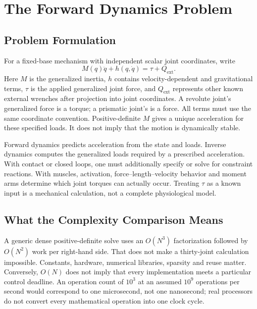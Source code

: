 \section{The Forward Dynamics Problem}
\label{sec:forward_dynamics_problem}

\subsection{Problem Formulation}
\label{subsec:fd_formulation}

For a fixed-base mechanism with independent scalar joint coordinates, write
\begin{equation}
 M(q)\ddot q+h(q,\dot q)=\tau+Q_{\mathrm{ext}}.
\end{equation}
Here $M$ is the generalized inertia, $h$ contains velocity-dependent and gravitational terms, $\tau$ is the applied generalized joint force, and $Q_{\mathrm{ext}}$ represents other known external wrenches after projection into joint coordinates. A revolute joint's generalized force is a torque; a prismatic joint's is a force. All terms must use the same coordinate convention. Positive-definite $M$ gives a unique acceleration for these specified loads. It does not imply that the motion is dynamically stable.

Forward dynamics predicts acceleration from the state and loads. Inverse dynamics computes the generalized loads required by a prescribed acceleration. With contact or closed loops, one must additionally specify or solve for constraint reactions. With muscles, activation, force--length--velocity behavior and moment arms determine which joint torques can actually occur. Treating $\tau$ as a known input is a mechanical calculation, not a complete physiological model.

\subsection{What the Complexity Comparison Means}
\label{subsec:why_not_invert}

A generic dense positive-definite solve uses an $O(N^3)$ factorization followed by $O(N^2)$ work per right-hand side. That does not make a thirty-joint calculation impossible. Constants, hardware, numerical libraries, sparsity and reuse matter. Conversely, $O(N)$ does not imply that every implementation meets a particular control deadline. An operation count of $10^3$ at an assumed $10^9$ operations per second would correspond to one microsecond, not one nanosecond; real processors do not convert every mathematical operation into one clock cycle.

